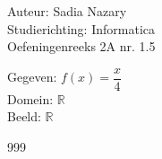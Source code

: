 \documentclass[a4paper]{article}
\begin{document}
\noindent \large Auteur: Sadia Nazary \\
\noindent \large Studierichting: Informatica \\
\noindent \large Oefeningenreeks 2A nr. 1.5 \\

\medskip

\normalsize

Gegeven: $f(x)=\dfrac{x}{4}$ \\

Domein: $\mathbb{R}$ \\

Beeld: $\mathbb{R}$ \\

\begin{thebibliography}{999}
\end{thebibliography}
\end{document}
